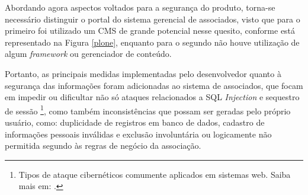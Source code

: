 Abordando agora aspectos voltados para a segurança do produto, torna-se necessário distinguir o portal do sistema gerencial de associados, visto que para o primeiro foi utilizado um CMS de grande potencial nesse quesito, conforme está representado na Figura \ref{plone}, enquanto para o segundo não houve utilização de algum \textit{framework} ou gerenciador de conteúdo. 

Portanto, as principais medidas implementadas pelo desenvolvedor quanto à segurança das informações foram adicionadas ao sistema de associados, que focam em impedir ou dificultar não só ataques relacionados a SQL \textit{Injection} e sequestro de sessão \footnote{Tipos de ataque cibernéticos comumente aplicados em sistemas web. Saiba mais em: .}, como também inconsistências que possam ser geradas pelo próprio usuário, como: duplicidade de registros em banco de dados, cadastro de informações pessoais inválidas e exclusão involuntária ou logicamente não permitida segundo às regras de negócio da associação.

